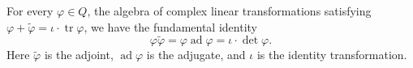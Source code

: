 For every $\varphi \in Q$, the algebra of complex linear transformations satisfying $\varphi + \tilde{\varphi} = \iota \cdot \operatorname{tr} \varphi$, we have the fundamental identity
$$
\varphi \tilde{\varphi} = \varphi \operatorname{ad} \varphi = \iota \cdot \det \varphi.
$$
Here $\tilde{\varphi}$ is the adjoint, $\operatorname{ad} \varphi$ is the adjugate, and $\iota$ is the identity transformation.
